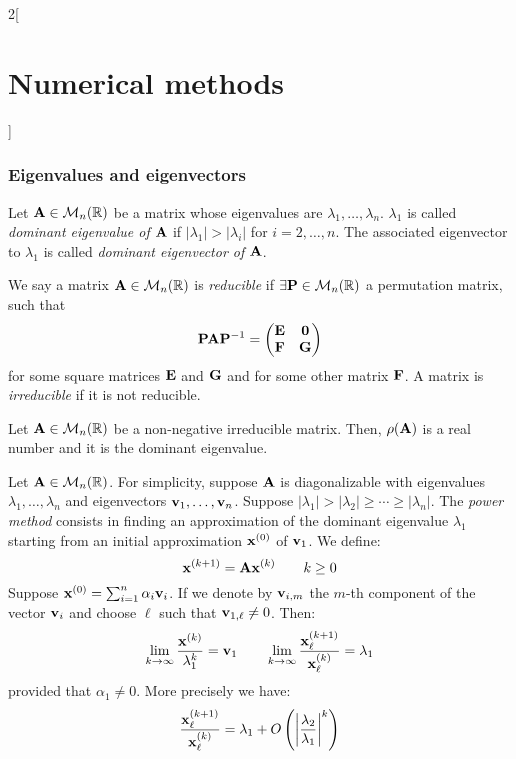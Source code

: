 \documentclass[../../../main.tex]{subfiles}
\begin{document}
\begin{multicols}{2}[\section{Numerical methods}]
    \subsubsection*{Eigenvalues and eigenvectors}
    \begin{definition}
        Let $\vb{A}\in\mathcal{M}_n(\mathbb{R})$ be a matrix whose eigenvalues are $\lambda_1,\ldots,\lambda_n$. $\lambda_1$ is called \textit{dominant eigenvalue of $\vb{A}$} if $|\lambda_1|>|\lambda_i|$ for $i=2,\ldots,n$. The associated eigenvector to $\lambda_1$ is called \textit{dominant eigenvector of $\vb{A}$}.
    \end{definition}
    \begin{definition}
        We say a matrix $\vb{A}\in\mathcal{M}_n(\mathbb{R})$ is \textit{reducible} if $\exists\vb{P}\in\mathcal{M}_n(\mathbb{R})$ a permutation matrix, such that $$\vb{P}\vb{A}\vb{P}^{-1}=
            \begin{pmatrix}
                \vb{E} & \vb{0} \\
                \vb{F} & \vb{G}
            \end{pmatrix}$$ for some square matrices $\vb{E}$ and $\vb{G}$ and for some other matrix $\vb{F}$. A matrix is \textit{irreducible} if it is not reducible.
    \end{definition}
    \begin{theorem}
        Let $\vb{A}\in\mathcal{M}_n(\mathbb{R})$ be a non-negative irreducible matrix. Then, $\rho(\vb{A})$ is a real number and it is the dominant eigenvalue.
    \end{theorem}
    \begin{method}
        Let $\vb{A}\in\mathcal{M}_n(\mathbb{R})$. For simplicity, suppose $\vb{A}$ is diagonalizable with eigenvalues $\lambda_1,\ldots,\lambda_n$ and eigenvectors $\vb{v}_1,\ldots,\vb{v}_n$. Suppose $|\lambda_1|>|\lambda_2|\geq\cdots\geq|\lambda_n|$. The \textit{power method} consists in finding an approximation of the dominant eigenvalue $\lambda_1$ starting from an initial approximation $\vb{x}^{(0)}$ of $\vb{v}_1$. We define: $$\vb{x}^{(k+1)}=\vb{A}\vb{x}^{(k)}\qquad k\geq 0$$ Suppose $\vb{x}^{(0)}=\sum_{i=1}^n\alpha_i\vb{v}_i$. If we denote by $\vb{v}_{i,m}$ the $m$-th component of the vector $\vb{v}_i$ and choose $\ell$ such that $\vb{v}_{1,\ell}\ne0$. Then: $$\lim_{k\to\infty}\frac{\vb{x}^{(k)}}{\lambda_1^k}=\vb{v}_1\qquad\lim_{k\to\infty}\frac{\vb{x}_\ell^{(k+1)}}{\vb{x}_\ell^{(k)}}=\lambda_1$$ provided that $\alpha_1\ne0$. More precisely we have: $$\frac{\vb{x}_\ell^{(k+1)}}{\vb{x}_\ell^{(k)}}=\lambda_1+O\left(\left|\frac{\lambda_2}{\lambda_1}\right|^k\right)$$

\end{method}
\end{multicols}
\end{document}

